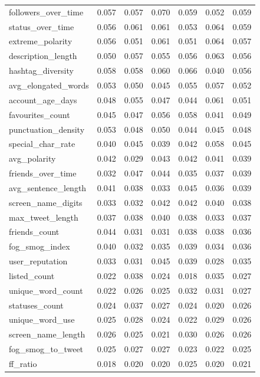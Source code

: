 \begin{tabular}{lrrrrrr}
followers_over_time & 0.057 & 0.057 & 0.070 & 0.059 & 0.052 & 0.059 \\
status_over_time & 0.056 & 0.061 & 0.061 & 0.053 & 0.064 & 0.059 \\
extreme_polarity & 0.056 & 0.051 & 0.061 & 0.051 & 0.064 & 0.057 \\
description_length & 0.050 & 0.057 & 0.055 & 0.056 & 0.063 & 0.056 \\
hashtag_diversity & 0.058 & 0.058 & 0.060 & 0.066 & 0.040 & 0.056 \\
avg_elongated_words & 0.053 & 0.050 & 0.045 & 0.055 & 0.057 & 0.052 \\
account_age_days & 0.048 & 0.055 & 0.047 & 0.044 & 0.061 & 0.051 \\
favourites_count & 0.045 & 0.047 & 0.056 & 0.058 & 0.041 & 0.049 \\
punctuation_density & 0.053 & 0.048 & 0.050 & 0.044 & 0.045 & 0.048 \\
special_char_rate & 0.040 & 0.045 & 0.039 & 0.042 & 0.058 & 0.045 \\
avg_polarity & 0.042 & 0.029 & 0.043 & 0.042 & 0.041 & 0.039 \\
friends_over_time & 0.032 & 0.047 & 0.044 & 0.035 & 0.037 & 0.039 \\
avg_sentence_length & 0.041 & 0.038 & 0.033 & 0.045 & 0.036 & 0.039 \\
screen_name_digits & 0.033 & 0.032 & 0.042 & 0.042 & 0.040 & 0.038 \\
max_tweet_length & 0.037 & 0.038 & 0.040 & 0.038 & 0.033 & 0.037 \\
friends_count & 0.044 & 0.031 & 0.031 & 0.038 & 0.038 & 0.036 \\
fog_smog_index & 0.040 & 0.032 & 0.035 & 0.039 & 0.034 & 0.036 \\
user_reputation & 0.033 & 0.031 & 0.045 & 0.039 & 0.028 & 0.035 \\
listed_count & 0.022 & 0.038 & 0.024 & 0.018 & 0.035 & 0.027 \\
unique_word_count & 0.022 & 0.026 & 0.025 & 0.032 & 0.031 & 0.027 \\
statuses_count & 0.024 & 0.037 & 0.027 & 0.024 & 0.020 & 0.026 \\
unique_word_use & 0.025 & 0.028 & 0.024 & 0.022 & 0.029 & 0.026 \\
screen_name_length & 0.026 & 0.025 & 0.021 & 0.030 & 0.026 & 0.026 \\
fog_smog_to_tweet & 0.025 & 0.027 & 0.027 & 0.023 & 0.022 & 0.025 \\
ff_ratio & 0.018 & 0.020 & 0.020 & 0.025 & 0.020 & 0.021 \\

\end{tabular}
